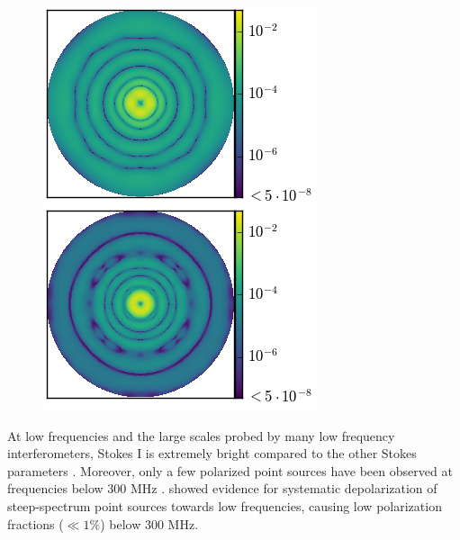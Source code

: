 \documentclass[twocolumn, trackchanges]{aastex61}
\begin{document}
\begin{figure}
\centering
\hspace{-0.5cm}\includegraphics[scale=0.6]{M_p.png}
\caption{}
\label{fig:lin_pol_beam}
\end{figure}


At low frequencies and the large scales probed by many low frequency interferometers, Stokes I is extremely bright compared to the other Stokes parameters \citep{Bernardi.09, Bernardi.10, Jelic.14, Jelic.15, Asad15, Kohn16, Lenc.17, Moore17}. Moreover, only a few polarized point sources have been observed at frequencies below 300 MHz \citep{Bernardi.13, Asad.16, Lenc.17}. \cite{Farnes.14} showed evidence for systematic depolarization of steep-spectrum point sources towards low frequencies, causing low polarization fractions ($\ll 1\%$) below 300 MHz. 
\end{document}
